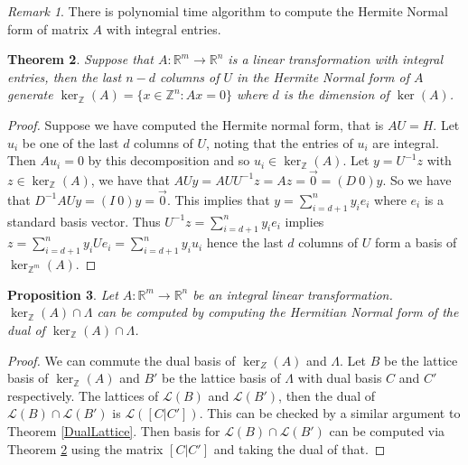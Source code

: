 \documentclass{article}
\newcommand{\Z}[0]{\mathbb{Z}}		%
\newcommand{\R}[0]{\mathbb{R}}		%
\newcommand{\La}[0]{\mathcal L}
\newtheorem{thm}{Theorem}[section]
\newtheorem{prop}[thm]{Proposition}
\theoremstyle{definition}
\theoremstyle{remark}
\newtheorem{rem}[thm]{Remark}
\begin{document}
\begin{rem}
There is polynomial time algorithm to compute the Hermite Normal form of matrix $A$ with integral entries. \cite{KoppeJesusBook} 
\end{rem}
\begin{thm}\label{LatticeBasis}
Suppose that $A:\R^m\to \R^n$ is a linear transformation with integral entries, then the last $n-d$ columns of $U$ in the Hermite Normal form of $A$ generate $\ker_\Z (A) =\{ x\in \Z^n: Ax = 0\}$ where $d$ is the dimension of $\ker(A)$.  
\end{thm}
\begin{proof}

 Suppose we have computed the Hermite normal form, that is $AU = H$. Let $u_i$ be one of the last $d$ columns of $U$, noting that the entries of $u_i$ are integral. Then $Au_i = 0$ by this decomposition and so $u_i\in \ker_{\Z}(A)$. Let $y = U^{-1}z$ with $z\in \ker_{\Z}(A)$, we have that $AUy = AUU^{-1}z = Az = \vec{0} = (D~0)y$. So we have that $D^{-1}AUy = (I~0)y =\vec{0}$. This implies that $y = \sum\limits_{i=d+1}^n y_ie_i$ where $e_i$ is a standard basis vector. Thus $U^{-1}z =\sum\limits_{i=d+1}^n y_ie_i  $ implies $z  =\sum\limits_{i=d+1}^n y_iUe_i =\sum\limits_{i=d+1}^n y_iu_i   $ hence the last $d$ columns of $U$ form a basis of $\ker_{\Z^m}(A). $ 

\end{proof}



\begin{prop}
Let $A:\R^m \to \R^n$ be an integral linear transformation. $\ker_\Z(A) \cap \Lambda$ can be computed by computing the Hermitian Normal form of the dual of $\ker_\Z(A) \cap \Lambda$.
\end{prop}
\begin{proof}
We can commute the dual basis of $\ker_Z(A)$ and $\Lambda$. Let $B$ be the lattice basis of $\ker_\Z(A)$ and $B'$ be the lattice basis of $\Lambda$ with dual basis $C$ and $C'$ respectively.   The lattices of $\La(B)$ and $\La(B')$, then the dual of $\La(B)\cap \La(B')$ is $\La([C|C'])$. This can be checked by a similar argument to Theorem \ref{DualLattice}. Then basis for $\La(B)\cap \La(B')$ can be computed via Theorem \ref{LatticeBasis} using the matrix $[C|C']$ and taking the dual of that. 
\end{proof}

\end{document}
